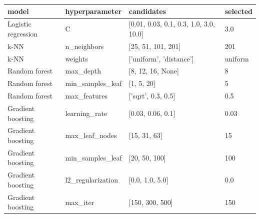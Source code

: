\begin{tabular}{llll}
\toprule
model & hyperparameter & candidates & selected \\
\midrule
Logistic regression & C & [0.01, 0.03, 0.1, 0.3, 1.0, 3.0, 10.0] & 3.0 \\
k-NN & n\_neighbors & [25, 51, 101, 201] & 201 \\
k-NN & weights & ['uniform', 'distance'] & uniform \\
Random forest & max\_depth & [8, 12, 16, None] & 8 \\
Random forest & min\_samples\_leaf & [1, 5, 20] & 5 \\
Random forest & max\_features & ['sqrt', 0.3, 0.5] & 0.5 \\
Gradient boosting & learning\_rate & [0.03, 0.06, 0.1] & 0.03 \\
Gradient boosting & max\_leaf\_nodes & [15, 31, 63] & 15 \\
Gradient boosting & min\_samples\_leaf & [20, 50, 100] & 100 \\
Gradient boosting & l2\_regularization & [0.0, 1.0, 5.0] & 0.0 \\
Gradient boosting & max\_iter & [150, 300, 500] & 150 \\
\bottomrule
\end{tabular}